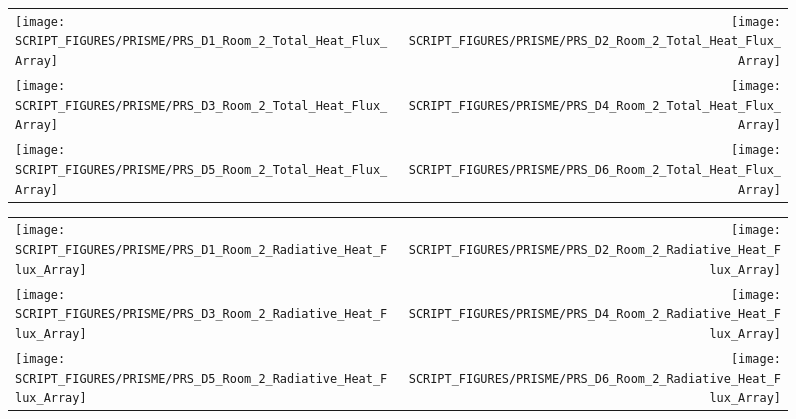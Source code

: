 \begin{figure}[p]
\begin{tabular*}{\textwidth}{l@{\extracolsep{\fill}}r}
\texttt{[image: SCRIPT\_FIGURES/PRISME/PRS\_D1\_Room\_2\_Total\_Heat\_Flux\_Array]} &
\texttt{[image: SCRIPT\_FIGURES/PRISME/PRS\_D2\_Room\_2\_Total\_Heat\_Flux\_Array]} \\
\texttt{[image: SCRIPT\_FIGURES/PRISME/PRS\_D3\_Room\_2\_Total\_Heat\_Flux\_Array]} &
\texttt{[image: SCRIPT\_FIGURES/PRISME/PRS\_D4\_Room\_2\_Total\_Heat\_Flux\_Array]} \\
\texttt{[image: SCRIPT\_FIGURES/PRISME/PRS\_D5\_Room\_2\_Total\_Heat\_Flux\_Array]} &
\texttt{[image: SCRIPT\_FIGURES/PRISME/PRS\_D6\_Room\_2\_Total\_Heat\_Flux\_Array]}
\end{tabular*}
\label{PRISME_Wall_Array_THF_Room_2}
\end{figure}

\begin{figure}[p]
\begin{tabular*}{\textwidth}{l@{\extracolsep{\fill}}r}
\texttt{[image: SCRIPT\_FIGURES/PRISME/PRS\_D1\_Room\_2\_Radiative\_Heat\_Flux\_Array]} &
\texttt{[image: SCRIPT\_FIGURES/PRISME/PRS\_D2\_Room\_2\_Radiative\_Heat\_Flux\_Array]} \\
\texttt{[image: SCRIPT\_FIGURES/PRISME/PRS\_D3\_Room\_2\_Radiative\_Heat\_Flux\_Array]} &
\texttt{[image: SCRIPT\_FIGURES/PRISME/PRS\_D4\_Room\_2\_Radiative\_Heat\_Flux\_Array]} \\
\texttt{[image: SCRIPT\_FIGURES/PRISME/PRS\_D5\_Room\_2\_Radiative\_Heat\_Flux\_Array]} &
\texttt{[image: SCRIPT\_FIGURES/PRISME/PRS\_D6\_Room\_2\_Radiative\_Heat\_Flux\_Array]}
\end{tabular*}
\label{PRISME_Wall_Array_RHF_Room_2}
\end{figure}


